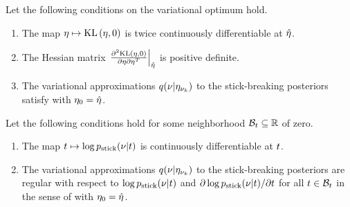 \begin{assu}
%
Let the following conditions on the variational optimum hold.
%
\begin{enumerate}
%
    \item {} The map $\eta \mapsto \mathrm{KL}\left(\eta, 0\right)$ is twice
    continuously differentiable at $\hat\eta$.

    \item{} The Hessian matrix $\left.\frac{\partial^2 \mathrm{KL}\left(\eta,
    0\right)}{\partial \eta \partial \eta^T}\right\vert_{\hat\eta}$ is positive definite.

    \item{} The variational approximations $q(\nu
    \vert \eta_{\nu_{k}})$ to the stick-breaking posteriors satisfy 
    with $\eta_0 = \hat\eta$.
%
\end{enumerate}
%
\end{assu}

\begin{assu}
%
Let the following conditions hold for some neighborhood $\mathcal{B}_t \subseteq
\mathbb{R}$ of zero.
%
\begin{enumerate}
%
    \item {} The map $t \mapsto \log p_{\mathrm{stick}}(\nu \vert
    t)$ is continuously differentiable at $t$.

    \item{} The variational approximations $q(\nu
    \vert \eta_{\nu_{k}})$ to the stick-breaking posteriors are regular with respect to
    $\log p_{\mathrm{stick}}(\nu \vert t)$  and $\partial \log p_{\mathrm{stick}}(\nu \vert t) /
    \partial t$ for all $t \in \mathcal{B}_t$ in the sense of 
    with $\eta_0 = \hat\eta$.
%
\end{enumerate}
%
\end{assu}


